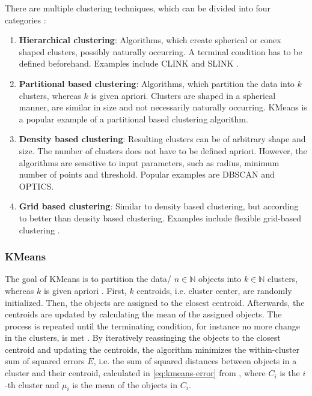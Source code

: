 There are multiple clustering techniques, which can be divided into four categories \cite{OPTICS2016}: 
\begin{enumerate}
    \item \textbf{Hierarchical clustering}:
    Algorithms, which create spherical or conex shaped clusters, possibly naturally occurring. 
    A terminal condition has to be defined beforehand.
    Examples include CLINK and SLINK \cite{OPTICS2014}.

    \item \textbf{Partitional based clustering}: 
    Algorithms, which partition the data into $k$ clusters, whereas $k$ is given apriori.
    Clusters are shaped in a spherical manner, are similar in size and not necessarily naturally occurring.
    KMeans is a popular example of a partitional based clustering algorithm.

    \item \textbf{Density based clustering}:
    Resulting clusters can be of arbitrary shape and size.
    The number of clusters does not have to be defined apriori.
    However, the algorithms are sensitive to input parameters, such as radius, minimum number of points and threshold.
    Popular examples are DBSCAN and OPTICS.
    
    \item \textbf{Grid based clustering}:
    Similar to density based clustering, but according to \citeauthor{OPTICS2016} better than density based clustering.
    Examples include flexible grid-based clustering \cite{OPTICS2014}.
    
\end{enumerate}

\subsubsection{KMeans}\label{subsec:kmeans}

The goal of KMeans is to partition the data/ $n \in \mathbb{N}$  objects into $k \in \mathbb{N}$  clusters, whereas $k$ is given apriori \cite{OPTICS_kMeans_2016}. %
First, $k$ centroids, i.e. cluster center, are randomly initialized.
Then, the objects are assigned to the closest centroid.
Afterwards, the centroids are updated by calculating the mean of the assigned objects.
The process is repeated until the terminating condition, for instance no more change in the clusters, is met \cite{OPTICS_kMeans_2016}.
By iteratively reassinging the objects to the closest centroid and updating the centroids, 
the algorithm minimizes the within-cluster sum of squared errors $E$, i.e. the sum of squared distances between objects in a cluster and their centroid, 
calculated in \autoref{eq:kmeans-error} from \cite{OPTICS_kMeans_2016}, 
where $C_{i}$ is the $i$-th cluster and $\mu_{i}$ is the mean of the objects in $C_{i}$.


